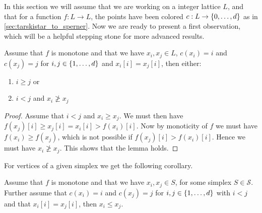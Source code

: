 In this section we will assume that we are working on a integer lattice $L$, and that for a function $f : L \rightarrow L$, the points have been colored $c : L \rightarrow \left\{0, \dots, d\right\}$ as in \cref{sec:tarskistar_to_sperner}. Now we are ready to present a first observation, which will be a helpful stepping stone for more advanced results.

\begin{lemma}
    Assume that $f$ is monotone and that we have $x_i, x_j \in L$, $c(x_i) = i$ and $c(x_j) = j$ for $i, j \in \left\{1, \dots, d\right\}$ and $x_i[i] = x_j[i]$, then either:
    \begin{enumerate}
        \item $i \geq j$ or
        \item $i < j$  and $x_i \not\geq x_j$
    \end{enumerate}
\end{lemma}
\begin{proof}
    Assume that $i < j$ and $x_i \geq x_j$. We must then have $f(x_j)[i] \geq x_j[i] = x_i[i] > f(x_i)[i]$. Now by monoticity of $f$ we must have $f(x_i) \geq f(x_j)$, which is not possible if $f(x_j)[i] > f(x_i)[i]$. Hence we must have $x_i \not\geq x_j$. This shows that the lemma holds.
\end{proof}

For vertices of a given simplex we get the following corollary.
\begin{corollary}
    Assume that $f$ is monotone and that we have $x_i, x_j \in S$, for some simplex $S\in  \mathcal{S}$. Further assume that $c(x_i) = i$ and $c(x_j) = j$ for $i, j \in \left\{1, \dots, d\right\}$ with $i < j$ and that $x_i[i] = x_j[i]$, then $x_i \leq x_j$.
\end{corollary}

